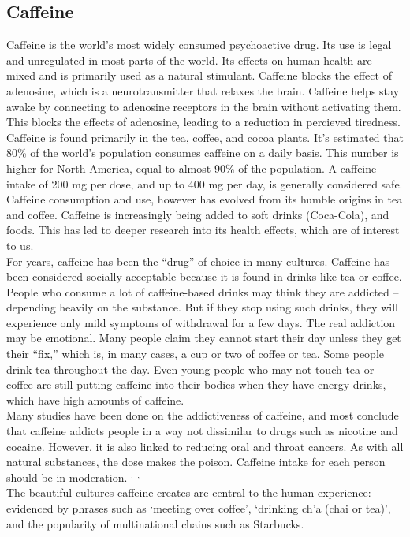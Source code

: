 \documentclass[11pt]{article}
\begin{document}
\subsection{Caffeine}
Caffeine is the world's most widely consumed psychoactive drug. Its use is legal and unregulated in
most parts of the world. Its effects on human health are mixed \cite{healtheffects} and is primarily
used as a natural stimulant. Caffeine blocks the effect of adenosine, which is a neurotransmitter
that relaxes the brain. Caffeine helps stay awake by connecting to adenosine receptors in the brain
without activating them. This blocks the effects of adenosine, leading to a reduction in percieved
tiredness. \\
Caffeine is found primarily in the tea, coffee, and cocoa plants. It's estimated \cite{80} that 80\%
of the world's population consumes caffeine on a daily basis. This number is higher for North
America, equal to almost 90\% of the population. A caffeine intake of 200 mg per dose, and up to 400
mg per day, is generally considered safe. \\
Caffeine consumption and use, however has evolved from its humble origins in tea and
coffee. Caffeine is increasingly being added to soft drinks (Coca-Cola), and foods. This has led to
deeper research into its health effects, which are of interest to us. \\
For years, caffeine has been the “drug” of choice in many cultures. Caffeine has been considered
socially acceptable because it is found in drinks like tea or coffee. People who consume a lot of
caffeine-based drinks may think they are addicted -- depending heavily on the substance. But if they
stop using such drinks, they will experience only mild symptoms of withdrawal for a few days.
The real addiction may be emotional. Many people claim they cannot start their day unless they get
their “fix,” which is, in many cases, a cup or two of coffee or tea. Some people drink tea throughout
the day. Even young people who may not touch tea or coffee are still putting caffeine into their
bodies when they have energy drinks, which have high amounts of caffeine.\\
Many studies have been done on the addictiveness of caffeine, and most conclude that caffeine
addicts people in a way not dissimilar to drugs such as nicotine and cocaine. However, it is also
linked to reducing oral and throat cancers. As with all natural substances, the dose makes the
poison. Caffeine intake for each person should be in moderation. \cite{caffhealth}$^,$
\cite{caffhealth2}$^,$ \cite{caffhealth3}\\
The beautiful cultures caffeine creates are central to the human experience: evidenced by phrases
such as `meeting over coffee', `drinking ch'a (chai or tea)', and the popularity of multinational
chains such as Starbucks. \\
\end{document}
